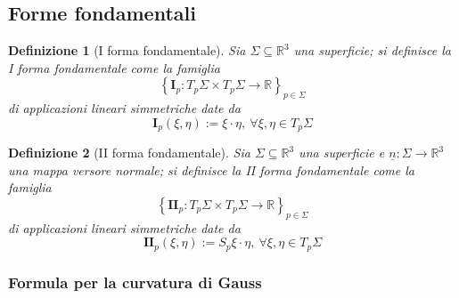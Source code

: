 \documentclass[12pt]{scrartcl}
\theoremstyle{style}
\newtheorem{definizione}{Definizione}[section]
\numberwithin{equation}{subsection}
\begin{document}
\subsection{Forme fondamentali}
\begin{definizione}
	[I forma fondamentale]
	Sia $\Sigma \subseteq \mathbb{R}^3$ una superficie; si definisce la \textit{I forma fondamentale} come la famiglia
	\[
		\left\{ \mathbf{I} _p : T_p \Sigma \times T_p \Sigma \to \mathbb{R} \right\} _{p \in \Sigma} 
	\] 
	di applicazioni lineari simmetriche date da
	\[
	\mathbf{I} _p (\xi ,\eta) := \xi \cdot \eta, \ \forall \xi ,\eta \in T_p\Sigma
	\] 
\end{definizione}
\begin{definizione}
	[II forma fondamentale]
	Sia $\Sigma \subseteq \mathbb{R}^3$ una superficie e $\underline{n}:\Sigma \to \mathbb{R}^3$ una mappa versore normale; si definisce la \textit{II forma fondamentale} come la famiglia
	\[
	\left\{ \mathbf{II}_p : T_p\Sigma \times T_p\Sigma \to \mathbb{R}  \right\} _{p \in \Sigma} 
	\] 
	di applicazioni lineari simmetriche date da 
	\[
	\mathbf{II} _p(\xi ,\eta) := S_p \xi \cdot \eta, \ \forall \xi ,\eta \in T_p\Sigma
	\] 
\end{definizione}	
\subsubsection{Formula per la curvatura di Gauss}
\end{document}
